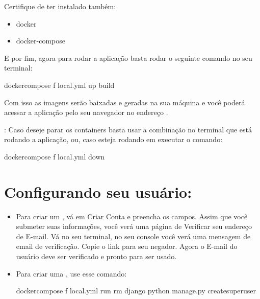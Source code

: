 \documentclass[letterpaper,10pt,english]{sphinxmanual}
\begin{document}
Certifique de ter instalado também:
\begin{itemize}
\item {} 
docker

\item {} 
docker-compose

\end{itemize}

E por fim, agora para rodar a aplicação basta rodar o seguinte comando no seu terminal:

\begin{sphinxVerbatim}[commandchars=\\\{\}]
\PYGZdl{} docker\PYGZhy{}compose \PYGZhy{}f local.yml up \PYGZhy{}\PYGZhy{}build
\end{sphinxVerbatim}

Com isso as imagens serão baixadas e geradas na sua máquina e você poderá acessar a aplicação pelo seu navegador no endereço .

: Caso deseje parar os containers basta usar a combinação  no terminal que está rodando a aplicação, ou, caso esteja rodando em  executar o comando:

\begin{sphinxVerbatim}[commandchars=\\\{\}]
\PYGZdl{} docker\PYGZhy{}compose \PYGZhy{}f local.yml down
\end{sphinxVerbatim}


\section{Configurando seu usuário:}
\label{\detokenize{install:configurando-seu-usuario}}\begin{itemize}
\item {} 
Para criar um , vá em Criar Conta e preencha os campos. Assim que você submeter suas informações, você verá uma página de \sphinxquotedblleft{}Verificar seu endereço de E-mail\sphinxquotedblright{}. Vá no seu terminal, no seu console você verá uma mensagem de email de verificação. Copie o link para seu negador. Agora o E-mail do usuário deve ser verificado e pronto para ser usado.

\item {} 
Para criar uma , use esse comando:

\begin{sphinxVerbatim}[commandchars=\\\{\}]
\PYGZdl{} docker\PYGZhy{}compose \PYGZhy{}f local.yml run \PYGZhy{}\PYGZhy{}rm django python manage.py createsuperuser
\end{sphinxVerbatim}

\end{itemize}
\end{document}
